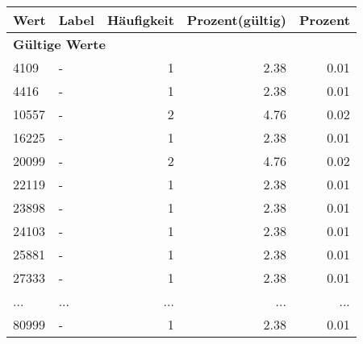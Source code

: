      \begin{longtable}{lXrrr}
     \toprule
     \textbf{Wert} & \textbf{Label} & \textbf{Häufigkeit} & \textbf{Prozent(gültig)} & \textbf{Prozent} \\
     \endhead
     \midrule
     \multicolumn{5}{l}{\textbf{Gültige Werte}}\\
        4109 & \multicolumn{1}{X}{-} & %
          \num{1} &
          \num[round-mode=places,round-precision=2]{2.38} &
          \num[round-mode=places,round-precision=2]{0.01} \\
        4416 & \multicolumn{1}{X}{-} & %
          \num{1} &
          \num[round-mode=places,round-precision=2]{2.38} &
          \num[round-mode=places,round-precision=2]{0.01} \\
        10557 & \multicolumn{1}{X}{-} & %
          \num{2} &
          \num[round-mode=places,round-precision=2]{4.76} &
          \num[round-mode=places,round-precision=2]{0.02} \\
        16225 & \multicolumn{1}{X}{-} & %
          \num{1} &
          \num[round-mode=places,round-precision=2]{2.38} &
          \num[round-mode=places,round-precision=2]{0.01} \\
        20099 & \multicolumn{1}{X}{-} & %
          \num{2} &
          \num[round-mode=places,round-precision=2]{4.76} &
          \num[round-mode=places,round-precision=2]{0.02} \\
        22119 & \multicolumn{1}{X}{-} & %
          \num{1} &
          \num[round-mode=places,round-precision=2]{2.38} &
          \num[round-mode=places,round-precision=2]{0.01} \\
        23898 & \multicolumn{1}{X}{-} & %
          \num{1} &
          \num[round-mode=places,round-precision=2]{2.38} &
          \num[round-mode=places,round-precision=2]{0.01} \\
        24103 & \multicolumn{1}{X}{-} & %
          \num{1} &
          \num[round-mode=places,round-precision=2]{2.38} &
          \num[round-mode=places,round-precision=2]{0.01} \\
        25881 & \multicolumn{1}{X}{-} & %
          \num{1} &
          \num[round-mode=places,round-precision=2]{2.38} &
          \num[round-mode=places,round-precision=2]{0.01} \\
        27333 & \multicolumn{1}{X}{-} & %
          \num{1} &
          \num[round-mode=places,round-precision=2]{2.38} &
          \num[round-mode=places,round-precision=2]{0.01} \\
       ... & ... & ... & ... & ... \\
        80999 & \multicolumn{1}{X}{-} & %
          \num{1} &
          \num[round-mode=places,round-precision=2]{2.38} &
          \num[round-mode=places,round-precision=2]{0.01} \\


\end{longtable}
